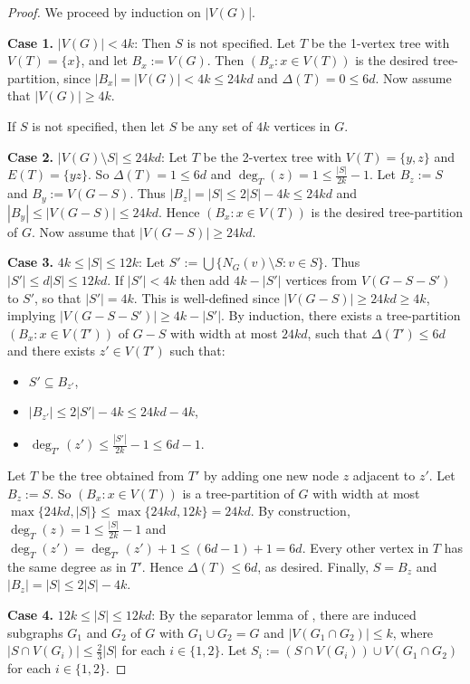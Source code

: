 \begin{proof}
We proceed by induction on $|V(G)$|.

\textbf{Case 1.} $|V(G)| < 4 k$: Then $S$ is not specified. Let $T$ be the 1-vertex tree with $V(T)=\{x\}$, and let $B_x:=V(G)$. Then $(B_x:x\in V(T))$ is the desired tree-partition, since $|B_x|=|V(G)|<4 k \leq 24 kd$ and $\Delta(T)=0\leq 6d$. Now assume that $|V(G)| \geq 4 k$. 

If $S$ is not specified, then let $S$ be any set of $4k$ vertices in $G$. 

\textbf{Case 2.} $|V(G)\setminus S|\leq 24kd$: Let $T$ be the 2-vertex tree with $V(T)=\{y,z\}$ and $E(T)=\{yz\}$. So $\Delta(T)=1\leq 6 d$ and $\deg_T(z)=1\leq \frac{|S|}{2k} - 1$. Let $B_z:=S$ and $B_y:=V(G-S)$. Thus $|B_z|=|S|\leq 2|S|-4k\leq 24kd$ and $|B_y|\leq |V(G-S)|\leq 24kd$. Hence $(B_x:x\in V(T))$ is the desired tree-partition of $G$. Now assume that $|V(G-S)|\geq 24kd$.

\textbf{Case 3.} $4k \leq |S|\leq 12 k$: Let $S':=\bigcup\{ N_G(v)\setminus S: v\in S\}$. Thus $|S'|\leq d |S|\leq 12 kd$. If $|S'|< 4 k$ then add $4k-|S'|$ vertices from $V(G-S-S')$ to $S'$, so that $|S'|=4k$. This is well-defined since 
$|V(G-S)| \geq 24kd \geq 4k$, implying $|V(G-S-S')| \geq 4k-|S'|$.
By induction, there exists a tree-partition $(B_x:x\in V(T'))$ of $G-S$ with width at most $24 kd$, such that $\Delta(T')\leq 6d$ and there exists $z'\in V(T')$ such that:
\begin{itemize}
    \item $S'\subseteq B_{z'}$, 
    \item $|B_{z'}|\leq 2|S'|-4k \leq 24kd -4k$,
    \item $\deg_{T'}(z')\leq \frac{|S'|}{2k}-1 \leq 6d-1$.
\end{itemize}
Let $T$ be the tree obtained from $T'$ by adding one new node $z$ adjacent to $z'$. Let $B_z:=S$. So $(B_x:x\in V(T))$ is a tree-partition of $G$ with width at most $\max\{24kd,|S|\}\leq\max\{24kd,12k\}=24kd$. By construction, $\deg_T(z)=1 \leq \frac{|S|}{2k}-1$ and $\deg_{T}(z') = \deg_{T'}(z')+1\leq (6d-1)+1=6d$. Every other vertex in $T$ has the same degree as in $T'$. Hence $\Delta(T)\leq 6d$, as desired. Finally, $S=B_z$ and $|B_z|=|S| \leq 2 |S|-4k$.

\textbf{Case 4.} $12 k \leq |S|\leq 12kd$: By the separator lemma of \citet[(2.6)]{RS-II}, there are induced subgraphs $G_1$ and $G_2$ of $G$ with $G_1\cup G_2=G$ and $|V(G_1\cap G_2)|\leq k$, where $|S\cap V(G_i)|\leq \frac23 |S|$ for each $i\in\{1,2\}$. Let $S_i := (S\cap V(G_i))\cup V(G_1\cap G_2)$ for each $i\in\{1,2\}$.


\end{proof}
